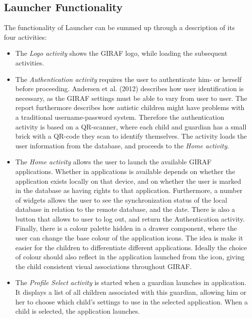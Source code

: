\subsection{Launcher Functionality}
The functionality of Launcher can be summed up through a description of its four activities:
\begin{itemize}
	\item The \textit{Logo activity} shows the GIRAF logo, while loading the subsequent activities.
	\item The \textit{Authentication activity} requires the user to authenticate him- or herself before proceeding. Andersen et al. (2012) describes how user identification is necessary, as the GIRAF settings must be able to vary from user to user. The report furthermore describes how autistic children might have problems with a traditional username-password system. Therefore the authentication activity is based on a QR-scanner, where each child and guardian has a small brick with a QR-code they scan to identify themselves. The activity loads the user information from the database, and proceeds to the \textit{Home activity}.
	\item The \textit{Home activity} allows the user to launch the available GIRAF applications. Whether in applications is available depends on whether the application exists locally on that device, and on whether the user is marked in the database as having rights to that application. Furthermore, a number of widgets allows the user to see the synchronization status of the local database in relation to the remote database, and the date. There is also a button that allows to user to log out, and return the Authentication activity. Finally, there is a colour palette hidden in a drawer component, where the user can change the base colour of the application icons. The idea is make it easier for the children to differentiate different applications. Ideally the choice of colour should also reflect in the application launched from the icon, giving the child consistent visual associations throughout GIRAF.
	\item The \textit{Profile Select activity} is started when a guardian launches in application. It displays a list of all children associated with this guardian, allowing him or her to choose which child's settings to use in the selected application. When a child is selected, the application launches.
\end{itemize}


